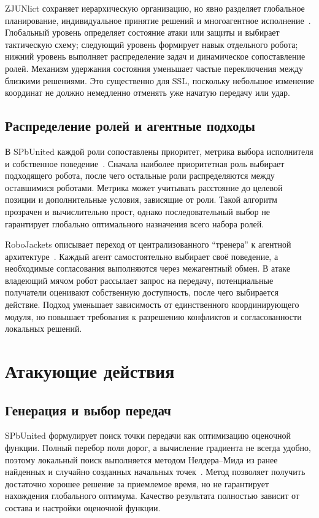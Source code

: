 \documentclass{misisarticle}
\begin{document}
ZJUNlict сохраняет иерархическую организацию, но явно разделяет глобальное планирование, индивидуальное принятие решений и многоагентное исполнение~\cite{zjunlict2025}. Глобальный уровень определяет состояние атаки или защиты и выбирает тактическую схему; следующий уровень формирует навык отдельного робота; нижний уровень выполняет распределение задач и динамическое сопоставление ролей. Механизм удержания состояния уменьшает частые переключения между близкими решениями. Это существенно для SSL, поскольку небольшое изменение координат не должно немедленно отменять уже начатую передачу или удар.

\subsection{Распределение ролей и агентные подходы}

В SPbUnited каждой роли сопоставлены приоритет, метрика выбора исполнителя и собственное поведение~\cite{spb2025}. Сначала наиболее приоритетная роль выбирает подходящего робота, после чего остальные роли распределяются между оставшимися роботами. Метрика может учитывать расстояние до целевой позиции и дополнительные условия, зависящие от роли. Такой алгоритм прозрачен и вычислительно прост, однако последовательный выбор не гарантирует глобально оптимального назначения всего набора ролей.

RoboJackets описывает переход от централизованного ``тренера'' к агентной архитектуре~\cite{robojackets2024}. Каждый агент самостоятельно выбирает своё поведение, а необходимые согласования выполняются через межагентный обмен. В атаке владеющий мячом робот рассылает запрос на передачу, потенциальные получатели оценивают собственную доступность, после чего выбирается действие. Подход уменьшает зависимость от единственного координирующего модуля, но повышает требования к разрешению конфликтов и согласованности локальных решений.

\section{Атакующие действия}

\subsection{Генерация и выбор передач}

SPbUnited формулирует поиск точки передачи как оптимизацию оценочной функции. Полный перебор поля дорог, а вычисление градиента не всегда удобно, поэтому локальный поиск выполняется методом Нелдера--Мида из ранее найденных и случайно созданных начальных точек~\cite{spb2025}. Метод позволяет получить достаточно хорошее решение за приемлемое время, но не гарантирует нахождения глобального оптимума. Качество результата полностью зависит от состава и настройки оценочной функции.
\end{document}
